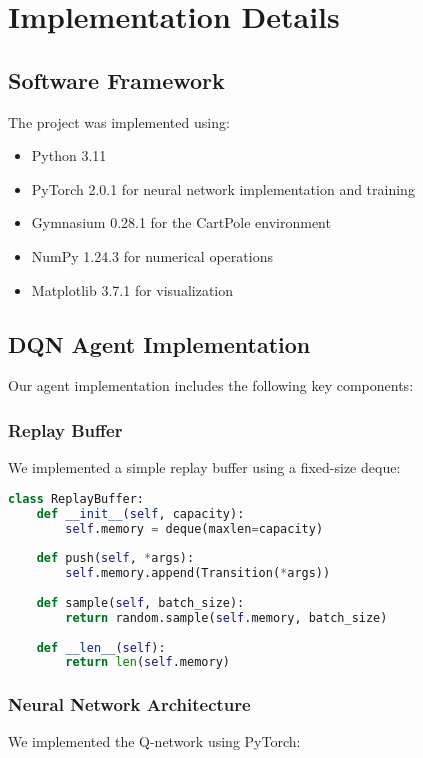 \documentclass[11pt,a4paper]{article}
\begin{document}
\section{Implementation Details}

\subsection{Software Framework}

The project was implemented using:
\begin{itemize}
    \item Python 3.11
    \item PyTorch 2.0.1 for neural network implementation and training
    \item Gymnasium 0.28.1 for the CartPole environment
    \item NumPy 1.24.3 for numerical operations
    \item Matplotlib 3.7.1 for visualization
\end{itemize}

\subsection{DQN Agent Implementation}

Our agent implementation includes the following key components:

\subsubsection{Replay Buffer}
We implemented a simple replay buffer using a fixed-size deque:

\begin{lstlisting}[language=Python, caption=Replay Buffer Implementation]
class ReplayBuffer:
    def __init__(self, capacity):
        self.memory = deque(maxlen=capacity)
    
    def push(self, *args):
        self.memory.append(Transition(*args))
    
    def sample(self, batch_size):
        return random.sample(self.memory, batch_size)
    
    def __len__(self):
        return len(self.memory)
\end{lstlisting}

\subsubsection{Neural Network Architecture}
We implemented the Q-network using PyTorch:
\end{document}
